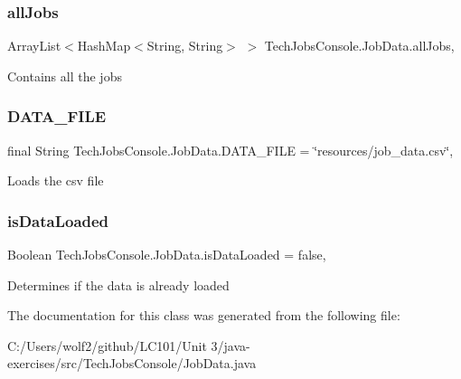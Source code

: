 \subsubsection{\texorpdfstring{allJobs}{allJobs}}
{\footnotesize\ttfamily Array\+List$<$Hash\+Map$<$String, String$>$ $>$ Tech\+Jobs\+Console.\+Job\+Data.\+all\+Jobs\hspace{0.3cm}{\ttfamily [static]}, {\ttfamily [private]}}

Contains all the jobs \mbox{\label{class_tech_jobs_console_1_1_job_data_a43a1a3c9d4939c8e05d2a8d11f02c0e0}} 
\subsubsection{\texorpdfstring{DATA\_FILE}{DATA\_FILE}}
{\footnotesize\ttfamily final String Tech\+Jobs\+Console.\+Job\+Data.\+D\+A\+T\+A\+\_\+\+F\+I\+LE = \char`\"{}resources/job\+\_\+data.\+csv\char`\"{}\hspace{0.3cm}{\ttfamily [static]}, {\ttfamily [private]}}

Loads the csv file \mbox{\label{class_tech_jobs_console_1_1_job_data_a9714fc6381422866943591bf909640f1}} 
\subsubsection{\texorpdfstring{isDataLoaded}{isDataLoaded}}
{\footnotesize\ttfamily Boolean Tech\+Jobs\+Console.\+Job\+Data.\+is\+Data\+Loaded = false\hspace{0.3cm}{\ttfamily [static]}, {\ttfamily [private]}}

Determines if the data is already loaded 

The documentation for this class was generated from the following file\+:\begin{DoxyCompactItemize}
\item 
C\+:/\+Users/wolf2/github/\+L\+C101/\+Unit 3/java-\/exercises/src/\+Tech\+Jobs\+Console/Job\+Data.\+java\end{DoxyCompactItemize}
